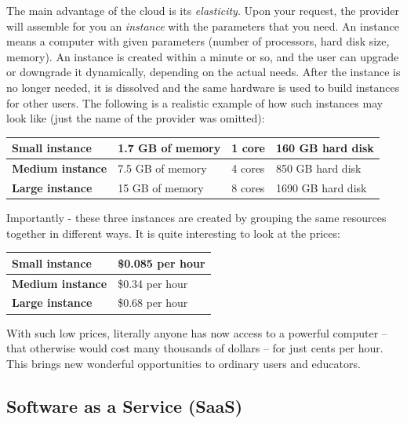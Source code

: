 \documentclass[article,A4,12pt]{llncs}
\begin{document}
The main advantage of the cloud is its {\em elasticity}. Upon your request, the
provider will assemble for you an {\em instance} with the parameters that 
you need. An instance means a computer with given parameters (number of processors, 
hard disk size, memory). An instance is created within a minute or so, and the user can upgrade 
or downgrade it dynamically, depending on the actual needs. After the instance is 
no longer needed, it is dissolved and the same hardware is used to build instances 
for other users. The following is a realistic example of how such instances may 
look like (just the name of the provider was omitted):\\

\begin{center}
\begin{tabular}{|l|l|l|l|}
\hline
{\bf Small instance} & 1.7 GB of memory & 1 core & 160 GB hard disk \\
\hline
{\bf Medium instance} & 7.5 GB of memory & 4 cores & 850 GB hard disk \\
\hline
{\bf Large instance} & 15 GB of memory & 8 cores & 1690 GB hard disk \\
\hline
\end{tabular}
\end{center}

\vspace{4mm}
\noindent
Importantly - these three instances are created by grouping the same resources together 
in different ways. 
It is quite interesting to look at the prices:

\begin{center}
\begin{tabular}{|l|l|}
\hline
{\bf Small instance} &	\$0.085 per hour\\
\hline
{\bf Medium instance}&	\$0.34 per hour	\\
\hline
{\bf Large instance}&	\$0.68 per hour\\
\hline
\end{tabular}
\end{center}

\vspace{4mm}
\noindent
With such low prices, literally anyone has now access to 
a powerful computer -- that otherwise would cost many thousands of dollars -- 
for just cents per hour. This brings new wonderful opportunities to ordinary users
and educators.

\subsection{Software as a Service (SaaS)}
\end{document}
